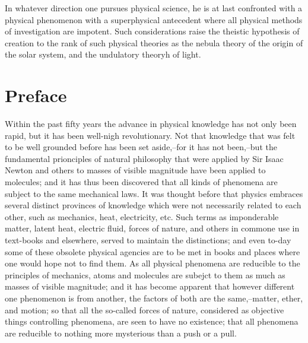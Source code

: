 \documentclass[oneside,12pt]{book}
\begin{document}
In whatever direction one pursues physical science, he is at last confronted with a physical phenomenon with a superphysical antecedent where all physical methods of investigation are 
impotent. Such considerations raise the theistic hypothesis of creation to the rank of such physical theories as the nebula theory of the origin of the solar system, and the undulatory
theoryh of light. \par 

\chapter{Preface}
Within the past fifty years the advance in physical knowledge has not only been rapid, but it has been well-nigh revolutionary. Not that knowledge that was felt 
to be well grounded before has been set aside,--for it has not been,--but the fundamental prionciples of natural philosophy that were applied by Sir Isaac Newton 
and others to masses of visible magnitude have been applied to molecules; and it has thus been discovered that all kinds of phenomena are subject to the same mechanical
laws. It was thought before that physics embraces several distinct provinces of knowledge which were not necessarily related to each other, such as mechanics,
heat, electricity, etc. Such terms as imponderable matter, latent heat, electric fluid, forces of nature, and others in commone use in text-books and elsewhere, 
served to maintain the distinctions; and even to-day some of these obsolete physical agencies are to be met in books and places where one would hope not to find them. 
As all physical phenomena are reducible to the principles of mechanics, atoms and molecules are subejct to them as much as masses of visible magnitude; and it has become apparent 
that however different one phenomenon is from another, the factors of both are the same,--matter, ether, and motion; so that all the so-called forces of nature, considered as objective 
things controlling phenomena, are seen to have no existence; that all phenomena are reducible to nothing more mysterious than a push or a pull. \par 

\end{document}
